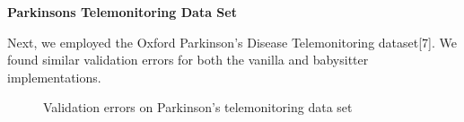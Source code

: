 \documentclass{article}
\begin{document}
\textbf{Parkinsons Telemonitoring Data Set}
\par Next, we employed the Oxford Parkinson's Disease Telemonitoring dataset[7]. We found similar validation errors for both the vanilla and babysitter implementations.
\begin{figure}[H]
	\centering
	\quad
	\caption{Validation errors on Parkinson's telemonitoring data set}%
	\label{Parkinsons}%
\end{figure}
\end{document}
